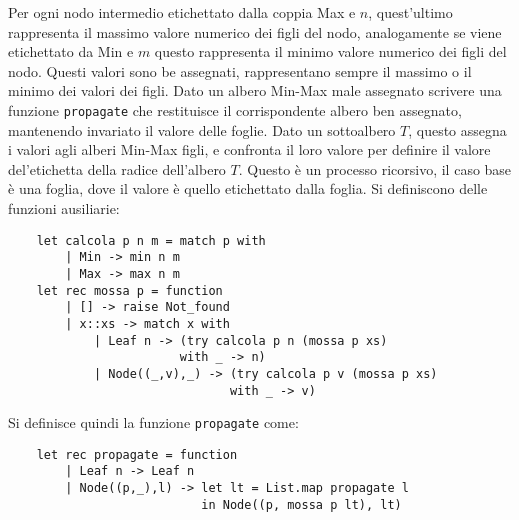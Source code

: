 \documentclass{article}
\numberwithin{equation}{subsection}
\begin{document}
Per ogni nodo intermedio etichettato dalla coppia Max e $n$, quest'ultimo rappresenta il massimo valore numerico dei figli del nodo, analogamente se viene etichettato da Min e $m$ questo rappresenta il minimo valore numerico dei figli del nodo. Questi valori sono be assegnati, rappresentano sempre il massimo o il minimo dei valori dei figli. 
Dato un albero Min-Max male assegnato scrivere una funzione \verb|propagate| che restituisce il corrispondente albero ben assegnato, mantenendo invariato il valore delle foglie. 
Dato un sottoalbero $T$, questo assegna i valori agli alberi Min-Max figli, e confronta il loro valore per definire il valore del'etichetta della radice dell'albero $T$. Questo è un processo ricorsivo, il caso base è una foglia, dove il valore è quello etichettato dalla foglia. 
Si definiscono delle funzioni ausiliarie:
\begin{verbatim}
    let calcola p n m = match p with
        | Min -> min n m
        | Max -> max n m
    let rec mossa p = function
        | [] -> raise Not_found
        | x::xs -> match x with
            | Leaf n -> (try calcola p n (mossa p xs)
                        with _ -> n)
            | Node((_,v),_) -> (try calcola p v (mossa p xs)
                               with _ -> v)
\end{verbatim}
Si definisce quindi la funzione \verb|propagate| come:
\begin{verbatim}
    let rec propagate = function
        | Leaf n -> Leaf n
        | Node((p,_),l) -> let lt = List.map propagate l
                           in Node((p, mossa p lt), lt)
\end{verbatim}

\clearpage
\end{document}
